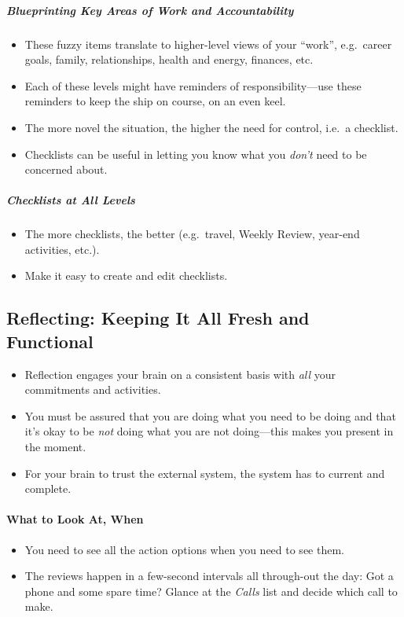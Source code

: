 \documentclass{article}
\begin{document}
\subparagraph{Blueprinting Key Areas of Work and Accountability}

\begin{itemize}
  \item These fuzzy items translate to higher-level views of your ``work'', e.g.\ career goals, family, relationships, health and energy, finances, etc.
  \item Each of these levels might have reminders of responsibility---use these reminders to keep the ship on course, on an even keel.
  \item The more novel the situation, the higher the need for control, i.e.\ a checklist.
  \item Checklists can be useful in letting you know what you \emph{don't} need to be concerned about.
\end{itemize}

\subparagraph{Checklists at All Levels}

\begin{itemize}
  \item The more checklists, the better (e.g.\ travel, Weekly Review, year-end activities, etc.).
  \item Make it easy to create and edit checklists.
\end{itemize}

\subsection{Reflecting: Keeping It All Fresh and Functional}

\begin{itemize}
  \item Reflection engages your brain on a consistent basis with \emph{all} your commitments and activities.
  \item You must be assured that you are doing what you need to be doing and that it's okay to be \emph{not} doing what you are not doing---this makes you present in the moment.
  \item For your brain to trust the external system, the system has to current and complete.
\end{itemize}

\paragraph{What to Look At, When}

\begin{itemize}
  \item You need to see all the action options when you need to see them.
  \item The reviews happen in a few-second intervals all through-out the day: Got a phone and some spare time? Glance at the \textit{Calls} list and decide which call to make.
\end{itemize}
\end{document}
